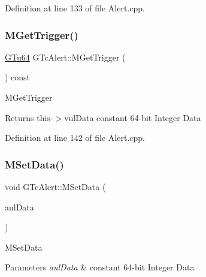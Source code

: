 Definition at line 133 of file Alert.\+cpp.

\mbox{\label{class_g_n_common_1_1_g_tc_alert_a9e582dccb2205b74923c5d93d787811e}} 
\subsubsection{\texorpdfstring{M\+Get\+Trigger()}{MGetTrigger()}}
{\footnotesize\ttfamily \mbox{\hyperlink{namespace_g_n_common_a01e8527dabf7ab4f123156b0701945eb}{G\+Tu64}} G\+Tc\+Alert\+::\+M\+Get\+Trigger (\begin{DoxyParamCaption}\item[{void}]{ }\end{DoxyParamCaption}) const}

M\+Get\+Trigger \begin{DoxyReturn}{Returns}
this-\/$>$vul\+Data constant 64-\/bit Integer Data 
\end{DoxyReturn}


Definition at line 142 of file Alert.\+cpp.

\mbox{\label{class_g_n_common_1_1_g_tc_alert_a04f768514f3e12f95e3a6887b02c0576}} 
\subsubsection{\texorpdfstring{M\+Set\+Data()}{MSetData()}}
{\footnotesize\ttfamily void G\+Tc\+Alert\+::\+M\+Set\+Data (\begin{DoxyParamCaption}\item[{const \mbox{\hyperlink{namespace_g_n_common_a01e8527dabf7ab4f123156b0701945eb}{G\+Tu64}}}]{aul\+Data }\end{DoxyParamCaption})}

M\+Set\+Data 
\begin{DoxyParams}{Parameters}
{\em aul\+Data} & constant 64-\/bit Integer Data \\
\hline
\end{DoxyParams}



